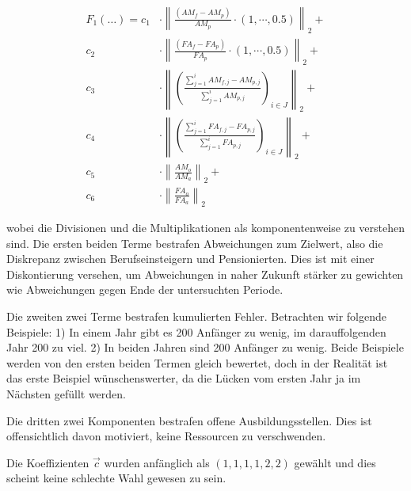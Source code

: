 \documentclass[a4paper,12pt]{article}
\begin{document}
\begin{align*}
F_1(\hdots) = 	c_1 &\cdot \left\| \frac{(AM_f - AM_p)}{AM_p} \cdot (1, \cdots, 0.5)  \right\|_2 + \\
			c_2 &\cdot \left\| \frac{(FA_f - FA_p)}{FA_p} \cdot (1, \cdots, 0.5)  \right\|_2  +\\
			c_3 &\cdot \left\| \left( \frac{ \sum\nolimits_{j=1}^i AM_{f,j} - AM_{p,j} }{\sum\nolimits_{j=1}^i AM_{p,j} } \right)_{i\in J} \right\|_2 +\\
			c_4 &\cdot \left\| \left( \frac{ \sum\nolimits_{j=1}^i FA_{f,j} - FA_{p,j} }{\sum\nolimits_{j=1}^i FA_{p,j} } \right)_{i\in J} \right\|_2 +\\
			c_5 &\cdot \left\| \frac{AM_o}{AM_a} \right\|_2 +\\
			c_6 &\cdot \left\| \frac{FA_o}{FA_a} \right\|_2 
\end{align*}

wobei die Divisionen und die Multiplikationen als komponentenweise zu verstehen sind. Die ersten beiden Terme bestrafen Abweichungen zum Zielwert, also die Diskrepanz zwischen Berufseinsteigern und Pensionierten. Dies ist mit einer Diskontierung versehen, um Abweichungen in naher Zukunft stärker zu gewichten wie Abweichungen gegen Ende der untersuchten Periode. 

Die zweiten zwei Terme bestrafen kumulierten Fehler. Betrachten wir folgende Beispiele: 1) In einem Jahr gibt es 200 Anfänger zu wenig, im darauffolgenden Jahr 200 zu viel. 2) In beiden Jahren sind 200 Anfänger zu wenig. Beide Beispiele werden von den ersten beiden Termen gleich bewertet, doch in der Realität ist das erste Beispiel wünschenswerter, da die Lücken vom ersten Jahr ja im Nächsten gefüllt werden. 

Die dritten zwei Komponenten bestrafen offene Ausbildungsstellen. Dies ist offensichtlich davon motiviert, keine Ressourcen zu verschwenden.

Die Koeffizienten $\vec c$ wurden anfänglich als $(1,1,1,1,2,2)$ gewählt und dies scheint keine schlechte Wahl gewesen zu sein.

%
%
%
\end{document}
